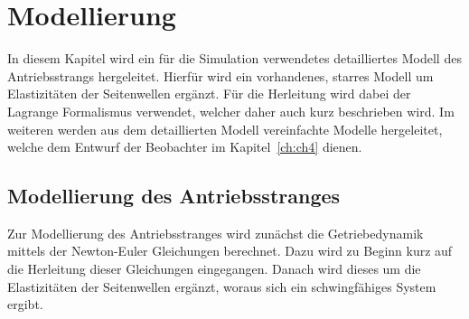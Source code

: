 \chapter{Modellierung}\label{ch:ch2}
In diesem Kapitel wird ein für die Simulation verwendetes detailliertes Modell des Antriebsstrangs hergeleitet. Hierfür wird ein vorhandenes, starres Modell um Elastizitäten der Seitenwellen ergänzt. Für die Herleitung wird dabei der Lagrange Formalismus verwendet, welcher daher auch kurz beschrieben wird. Im weiteren werden aus dem detaillierten Modell vereinfachte Modelle hergeleitet, welche dem Entwurf der Beobachter im Kapitel~\ref{ch:ch4} dienen.


\section{Modellierung des Antriebsstranges}
Zur Modellierung des Antriebsstranges wird zunächst die Getriebedynamik mittels der Newton-Euler Gleichungen berechnet. Dazu wird zu Beginn kurz auf die Herleitung dieser Gleichungen eingegangen. Danach wird dieses um die Elastizitäten der Seitenwellen ergänzt, woraus sich ein schwingfähiges System ergibt.  

